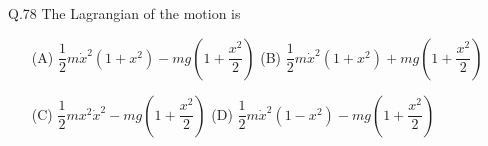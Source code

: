 \documentclass{article}
\begin{document}
																																																																																																																				    Q.78 \quad The Lagrangian of the motion is
																																																																																																																				    \begin{itemize}
																																																																																																																				        \item[(A)] $\dfrac{1}{2} m \dot{x}^2 (1 + x^2) - mg \left(1 + \dfrac{x^2}{2} \right)$ \hspace{4cm} (B) $\dfrac{1}{2} m \dot{x}^2 (1 + x^2) + mg \left(1 + \dfrac{x^2}{2} \right)$
																																																																																																																					   
																																																																																																																					       \item[(C)] $\dfrac{1}{2} m x^2 \dot{x}^2 - mg \left(1 + \dfrac{x^2}{2} \right)$ \hspace{5cm}(D) $\dfrac{1}{2} m \dot{x}^2 (1 - x^2) - mg \left(1 + \dfrac{x^2}{2} \right)$
																																																																																																																					           
																																																																																																																						   \end{itemize}
\end{document}
